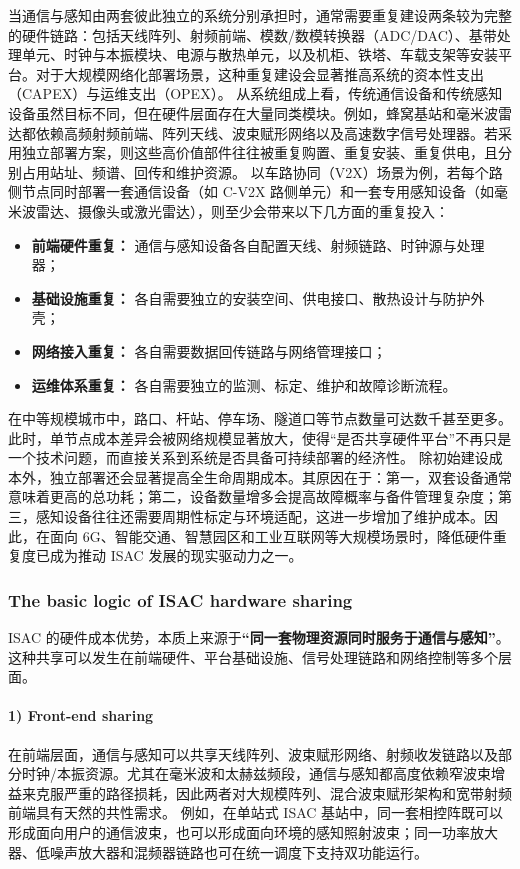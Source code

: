当通信与感知由两套彼此独立的系统分别承担时，通常需要重复建设两条较为完整的硬件链路：包括天线阵列、射频前端、模数/数模转换器（ADC/DAC）、基带处理单元、时钟与本振模块、电源与散热单元，以及机柜、铁塔、车载支架等安装平台。对于大规模网络化部署场景，这种重复建设会显著推高系统的资本性支出（CAPEX）与运维支出（OPEX）\cite{Zhang2021ISAC6G,Liu2022ISAC,ITU2030}。
从系统组成上看，传统通信设备和传统感知设备虽然目标不同，但在硬件层面存在大量同类模块。例如，蜂窝基站和毫米波雷达都依赖高频射频前端、阵列天线、波束赋形网络以及高速数字信号处理器。若采用独立部署方案，则这些高价值部件往往被重复购置、重复安装、重复供电，且分别占用站址、频谱、回传和维护资源。
以车路协同（V2X）场景为例，若每个路侧节点同时部署一套通信设备（如 C-V2X 路侧单元）和一套专用感知设备（如毫米波雷达、摄像头或激光雷达），则至少会带来以下几方面的重复投入：
\begin{itemize}
    \item \textbf{前端硬件重复：} 通信与感知设备各自配置天线、射频链路、时钟源与处理器；
    \item \textbf{基础设施重复：} 各自需要独立的安装空间、供电接口、散热设计与防护外壳；
    \item \textbf{网络接入重复：} 各自需要数据回传链路与网络管理接口；
    \item \textbf{运维体系重复：} 各自需要独立的监测、标定、维护和故障诊断流程。
\end{itemize}
在中等规模城市中，路口、杆站、停车场、隧道口等节点数量可达数千甚至更多。此时，单节点成本差异会被网络规模显著放大，使得“是否共享硬件平台”不再只是一个技术问题，而直接关系到系统是否具备可持续部署的经济性。
除初始建设成本外，独立部署还会显著提高全生命周期成本。其原因在于：第一，双套设备通常意味着更高的总功耗；第二，设备数量增多会提高故障概率与备件管理复杂度；第三，感知设备往往还需要周期性标定与环境适配，这进一步增加了维护成本。因此，在面向 6G、智能交通、智慧园区和工业互联网等大规模场景时，降低硬件重复度已成为推动 ISAC 发展的现实驱动力之一。

\subsubsection{The basic logic of ISAC hardware sharing}
\label{subsubsec:ch1-isac-core value-hardware-sharing}

ISAC 的硬件成本优势，本质上来源于\textbf{“同一套物理资源同时服务于通信与感知”}。这种共享可以发生在前端硬件、平台基础设施、信号处理链路和网络控制等多个层面。
\paragraph{1) Front-end sharing}
在前端层面，通信与感知可以共享天线阵列、波束赋形网络、射频收发链路以及部分时钟/本振资源。尤其在毫米波和太赫兹频段，通信与感知都高度依赖窄波束增益来克服严重的路径损耗，因此两者对大规模阵列、混合波束赋形架构和宽带射频前端具有天然的共性需求\cite{Zhang2021ISAC6G, Wei2023Integrated}。  
例如，在单站式 ISAC 基站中，同一套相控阵既可以形成面向用户的通信波束，也可以形成面向环境的感知照射波束；同一功率放大器、低噪声放大器和混频器链路也可在统一调度下支持双功能运行。
